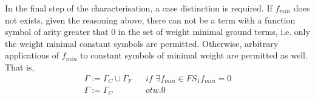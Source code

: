 \documentclass[11pt,a4paper]{article}
\begin{document}
In the final step of the characterisation, a case distinction is required. If $f_{min}$ does not exists, given the reasoning above, there can not be a term with a function symbol of arity greater that 0 in the set of weight minimal ground terms, i.e. only the weight minimal constant symbols are permitted. Otherwise, arbitrary applications of $f_{min}$ to constant symbols of minimal weight are permitted as well. That is,
\begin{align*}
&\Gamma := \Gamma_C \cup \Gamma_F&& \textit{if } \exists f_{min} \in \mathit{FS}_1 f_{min}=0& \\
&\Gamma := \Gamma_C && otw.0
\end{align*}



%
%
%
%
%
\end{document}
